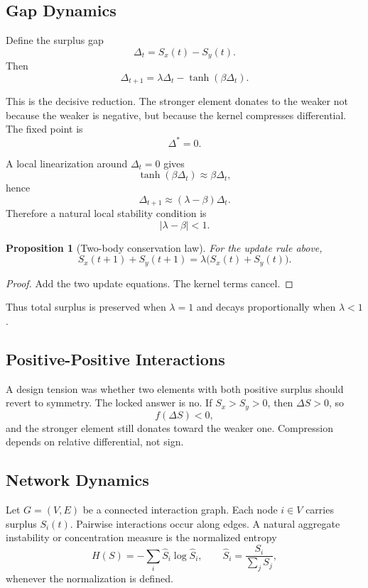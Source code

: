 \documentclass[11pt]{article}
\newtheorem{proposition}{Proposition}
\begin{document}
\subsection{Gap Dynamics}

Define the surplus gap
\[
\Delta_t = S_x(t)-S_y(t).
\]
Then
\[
\Delta_{t+1} = \lambda \Delta_t - \tanh(\beta \Delta_t).
\]

This is the decisive reduction. The stronger element donates to the weaker not because the weaker is negative, but because the kernel compresses differential. The fixed point is
\[
\Delta^\ast = 0.
\]

A local linearization around \(\Delta_t=0\) gives
\[
\tanh(\beta \Delta_t) \approx \beta \Delta_t,
\]
hence
\[
\Delta_{t+1} \approx (\lambda-\beta)\Delta_t.
\]
Therefore a natural local stability condition is
\[
|\lambda-\beta|<1.
\]

\begin{proposition}[Two-body conservation law]
For the update rule above,
\[
S_x(t+1)+S_y(t+1)=\lambda\bigl(S_x(t)+S_y(t)\bigr).
\]
\end{proposition}

\begin{proof}
Add the two update equations. The kernel terms cancel.
\end{proof}

Thus total surplus is preserved when \(\lambda=1\) and decays proportionally when \(\lambda<1\).

\subsection{Positive-Positive Interactions}

A design tension was whether two elements with both positive surplus should revert to symmetry. The locked answer is no. If \(S_x>S_y>0\), then \(\Delta S>0\), so
\[
f(\Delta S) < 0,
\]
and the stronger element still donates toward the weaker one. Compression depends on relative differential, not sign.

\subsection{Network Dynamics}

Let \(G=(V,E)\) be a connected interaction graph. Each node \(i\in V\) carries surplus \(S_i(t)\). Pairwise interactions occur along edges. A natural aggregate instability or concentration measure is the normalized entropy
\[
H(S) = -\sum_i \hat S_i \log \hat S_i,
\qquad
\hat S_i=\frac{S_i}{\sum_j S_j},
\]
whenever the normalization is defined.
\end{document}
